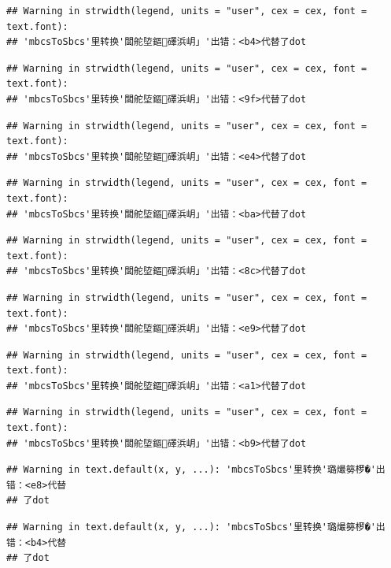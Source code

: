 \documentclass[
]{book}
\begin{document}
\begin{verbatim}
## Warning in strwidth(legend, units = "user", cex = cex, font = text.font):
## 'mbcsToSbcs'里转换'闆舵埅鏂礋浜岄」'出错：<b4>代替了dot
\end{verbatim}

\begin{verbatim}
## Warning in strwidth(legend, units = "user", cex = cex, font = text.font):
## 'mbcsToSbcs'里转换'闆舵埅鏂礋浜岄」'出错：<9f>代替了dot
\end{verbatim}

\begin{verbatim}
## Warning in strwidth(legend, units = "user", cex = cex, font = text.font):
## 'mbcsToSbcs'里转换'闆舵埅鏂礋浜岄」'出错：<e4>代替了dot
\end{verbatim}

\begin{verbatim}
## Warning in strwidth(legend, units = "user", cex = cex, font = text.font):
## 'mbcsToSbcs'里转换'闆舵埅鏂礋浜岄」'出错：<ba>代替了dot
\end{verbatim}

\begin{verbatim}
## Warning in strwidth(legend, units = "user", cex = cex, font = text.font):
## 'mbcsToSbcs'里转换'闆舵埅鏂礋浜岄」'出错：<8c>代替了dot
\end{verbatim}

\begin{verbatim}
## Warning in strwidth(legend, units = "user", cex = cex, font = text.font):
## 'mbcsToSbcs'里转换'闆舵埅鏂礋浜岄」'出错：<e9>代替了dot
\end{verbatim}

\begin{verbatim}
## Warning in strwidth(legend, units = "user", cex = cex, font = text.font):
## 'mbcsToSbcs'里转换'闆舵埅鏂礋浜岄」'出错：<a1>代替了dot
\end{verbatim}

\begin{verbatim}
## Warning in strwidth(legend, units = "user", cex = cex, font = text.font):
## 'mbcsToSbcs'里转换'闆舵埅鏂礋浜岄」'出错：<b9>代替了dot
\end{verbatim}

\begin{verbatim}
## Warning in text.default(x, y, ...): 'mbcsToSbcs'里转换'璐熶簩椤�'出错：<e8>代替
## 了dot
\end{verbatim}

\begin{verbatim}
## Warning in text.default(x, y, ...): 'mbcsToSbcs'里转换'璐熶簩椤�'出错：<b4>代替
## 了dot
\end{verbatim}
\end{document}

